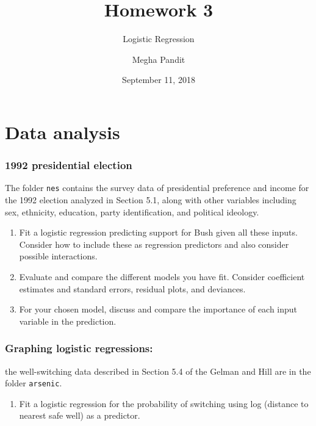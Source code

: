 \documentclass[]{article}
\title{Homework 3}
\subtitle{Logistic Regression}
\author{Megha Pandit}
\date{September 11, 2018}
\providecommand{\tightlist}{%
  \setlength{\itemsep}{0pt}\setlength{\parskip}{0pt}}
\begin{document}
\maketitle

\section{Data analysis}\label{data-analysis}

\subsubsection{1992 presidential election}\label{presidential-election}

The folder \texttt{nes} contains the survey data of presidential
preference and income for the 1992 election analyzed in Section 5.1,
along with other variables including sex, ethnicity, education, party
identification, and political ideology.

\begin{enumerate}
\def\labelenumi{\arabic{enumi}.}
\item
  Fit a logistic regression predicting support for Bush given all these
  inputs. Consider how to include these as regression predictors and
  also consider possible interactions.
\item
  Evaluate and compare the different models you have fit. Consider
  coefficient estimates and standard errors, residual plots, and
  deviances.
\item
  For your chosen model, discuss and compare the importance of each
  input variable in the prediction.
\end{enumerate}

\subsubsection{Graphing logistic
regressions:}\label{graphing-logistic-regressions}

the well-switching data described in Section 5.4 of the Gelman and Hill
are in the folder \texttt{arsenic}.

\begin{enumerate}
\def\labelenumi{\arabic{enumi}.}
\tightlist
\item
  Fit a logistic regression for the probability of switching using log
  (distance to nearest safe well) as a predictor.
\end{enumerate}
\end{document}
